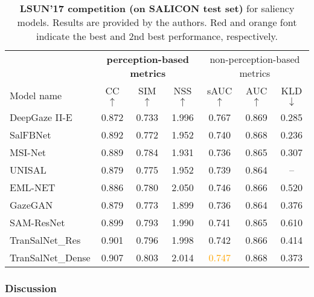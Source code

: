 \documentclass{article}
\begin{document}
\begin{table}[]
\caption{\textbf{LSUN'17 competition (on SALICON test set)} for saliency models. Results are provided by the authors. {\color{red}Red} and {\color{orange}orange} font indicate the best and 2nd best performance, respectively.}\label{tb:perf_comp_SALICON}
\centering
\renewcommand{\arraystretch}{1.2}
\begin{adjustbox}{width=0.48\textwidth}
\begin{tabular}{l|c c c c c c }
\toprule

& \multicolumn{3}{c|}{\textbf{perception-based metrics}}              
& \multicolumn{3}{c}{non-perception-based metrics} \\
Model name & CC $\uparrow$ & SIM $\uparrow$ & \multicolumn{1}{c|}{NSS $\uparrow$} & sAUC $\uparrow$ &  AUC $\uparrow$ &  KLD $\downarrow$ \\ \midrule \midrule

DeepGaze II-E~\cite{DP2E}& 0.872 & 0.733 & \multicolumn{1}{c|}{1.996} & {\color{red}0.767} & {\color{red}0.869} &{\color{orange}0.285}\\
SalFBNet~\cite{SalFBNet}&  0.892 &  0.772 & \multicolumn{1}{c|}{1.952} & 0.740 & {\color{orange}0.868} &{\color{red}0.236}\\
MSI-Net~\cite{MSI-Net}& 0.889 & 0.784 & \multicolumn{1}{c|}{1.931} & 0.736 & 0.865 &0.307\\
UNISAL~\cite{UNISAL}& 0.879 & 0.775 & \multicolumn{1}{c|}{1.952} & 0.739 & 0.864 & -- \\
EML-NET~\cite{EML-NET}& 0.886 & 0.780 & \multicolumn{1}{c|}{{\color{red}2.050}} & 0.746 & 0.866 & 0.520 \\
GazeGAN~\cite{GAZEGAN}& 0.879 & 0.773 & \multicolumn{1}{c|}{1.899} & 0.736 & 0.864 &0.376\\
SAM-ResNet~\cite{SAM_Cornia}& 0.899  &0.793 & \multicolumn{1}{c|}{1.990}  & 0.741 & 0.865 & 0.610 \\
\midrule
TranSalNet\_Res & {\color{orange}0.901} & {\color{orange}0.796} & \multicolumn{1}{c|}{1.998} & 0.742 & 0.866 & 0.414 \\ 
TranSalNet\_Dense & {\color{red}0.907} & {\color{red}0.803} & \multicolumn{1}{c|}{{\color{orange}2.014}} & \textcolor{orange}{0.747} & {\color{orange}0.868} & 0.373 \\ 
\bottomrule
\end{tabular}
\end{adjustbox}
\end{table}

\subsubsection{Discussion}
\end{document}
